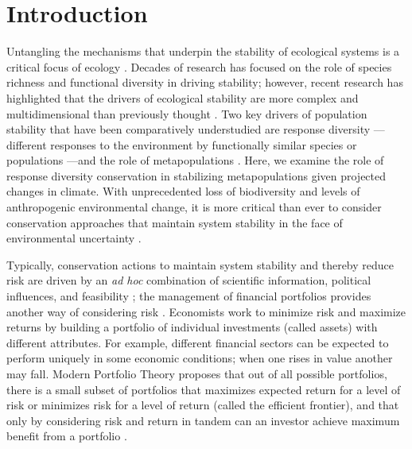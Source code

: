 \noindent


\section{Introduction}

Untangling the mechanisms that underpin the stability of ecological systems is a critical focus of ecology \citep[e.g.][]{ives2007, demazancourt2013}. Decades of research has focused on the role of species richness and functional diversity in driving stability; however, recent research has highlighted that the drivers of ecological stability are more complex and multidimensional than previously thought \citep[e.g.][]{balvanera2006, ives2007, demazancourt2013}. Two key drivers of population stability that have been comparatively understudied are response diversity \citep{winfree2009, mori2013}---different responses to the environment by functionally similar species or populations \citep{elmqvist2003}---and the role of metapopulations \citep{schtickzelle2007}. Here, we examine the role of response diversity conservation in stabilizing metapopulations given projected changes in climate. With unprecedented loss of biodiversity and levels of anthropogenic environmental change, it is more critical than ever to consider conservation approaches that maintain system stability in the face of environmental uncertainty \citep{lee2008, ando2012}.

Typically, conservation actions to maintain system stability and thereby reduce risk are driven by an \emph{ad hoc} combination of scientific information, political influences, and feasibility \citep{margules2000}; the management of financial portfolios provides another way of considering risk \citep[e.g.][]{figge2004, koellner2006, ando2012, haak2012}. Economists work to minimize risk and maximize returns by building a portfolio of individual investments (called assets) with different attributes. For example, different financial sectors can be expected to perform uniquely in some economic conditions; when one rises in value another may fall. Modern Portfolio Theory proposes that out of all possible portfolios, there is a small subset of portfolios that maximizes expected return for a level of risk or minimizes risk for a level of return (called the efficient frontier), and that only by considering risk and return in tandem can an investor achieve maximum benefit from a portfolio \citep{markowitz1952}.

